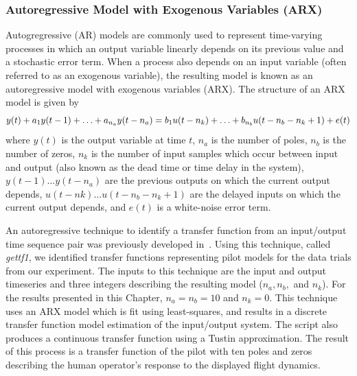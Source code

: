 \subsubsection{Autoregressive Model with Exogenous Variables (ARX)}
Autogregressive (AR) models are commonly used to represent time-varying processes in which an output variable linearly depends on its previous value and a stochastic error term.
When a process also depends on an input variable (often referred to as an exogenous variable), the resulting model is known as an autoregressive model with exogenous variables (ARX).
The structure of an ARX model is given by
\begin{equation}
    y(t) + a_1 y(t-1) + \ldots + a_{n_a} y(t - n_a) = \\
    b_1 u(t-n_k) + \ldots + b_{n_b} u(t-n_b - n_k+1) + e(t)
\end{equation}
where $y(t)$ is the output variable at time $t$, $n_a$ is the number of poles, $n_b$ is the number of zeros, $n_k$ is the number of input samples which occur between input and output (also known as the dead time or time delay in the system), $y(t-1) \ldots y(t-n_a)$ are the previous outputs on which the current output depends, $u(t-nk) \ldots u(t-n_b - n_k+1)$ are the delayed inputs on which the current output depends, and $e(t)$ is a white-noise error term.

An autoregressive technique to identify a transfer function from an input/output time sequence pair was previously developed in~\citet{hess_modeling_2002}.
Using this technique, called \textit{gettf1}, we identified transfer functions representing pilot models for the data trials from our experiment.
The inputs to this technique are the input and output timeseries and three integers describing the resulting model ($n_a, n_b,$ and $n_k$).
For the results presented in this Chapter, $n_a = n_b = 10$ and $n_k = 0$.
This technique uses an ARX model which is fit using least-squares, and results in a discrete transfer function model estimation of the input/output system.
The script also produces a continuous transfer function using a Tustin approximation.
The result of this process is a transfer function of the pilot with ten poles and zeros describing the human operator's response to the displayed flight dynamics.

